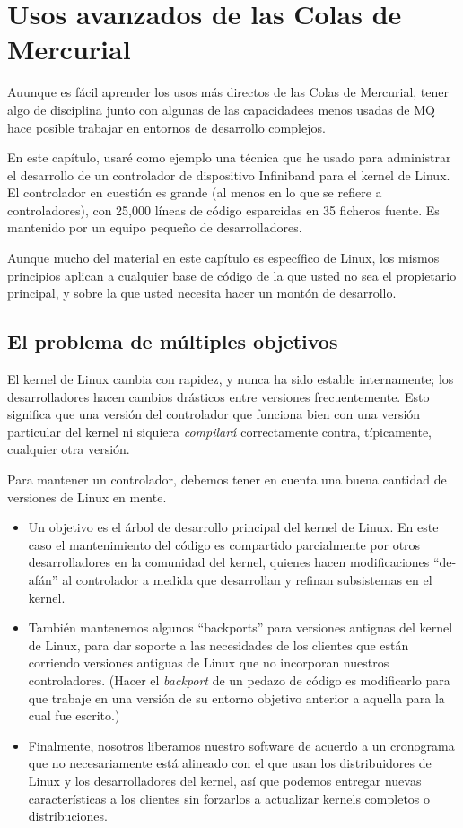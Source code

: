 \chapter{Usos avanzados de las Colas de Mercurial}
\label{chap:mq-collab}

Auunque es fácil aprender los usos más directos de las Colas de
Mercurial, tener algo de disciplina junto con algunas de las
capacidadees menos usadas de MQ hace posible trabajar en entornos de
desarrollo complejos.

En este capítulo, usaré como ejemplo una técnica que he usado para
administrar el desarrollo de un controlador de dispositivo Infiniband
para el kernel de Linux. El controlador en cuestión es grande
(al menos en lo que se refiere a controladores), con 25,000 líneas de
código esparcidas en 35 ficheros fuente. Es mantenido por un equipo
pequeño de desarrolladores. 

Aunque mucho del material en este capítulo es específico de Linux, los
mismos principios aplican a cualquier base de código de la que usted
no sea el propietario principal, y sobre la que usted necesita hacer
un montón de desarrollo.

\section{El problema de múltiples objetivos}

El kernel de Linux cambia con rapidez, y nunca ha sido estable
internamente; los desarrolladores hacen cambios drásticos entre
versiones frecuentemente. Esto significa que una versión del
controlador que funciona bien con una versión particular del kernel ni
siquiera \emph{compilará} correctamente contra, típicamente, cualquier
otra versión.

Para mantener un controlador, debemos tener en cuenta una buena
cantidad de versiones de Linux en mente.
\begin{itemize}
\item Un objetivo es el árbol de desarrollo principal del kernel de
  Linux. En este caso el mantenimiento del código es compartido
  parcialmente por otros desarrolladores en la comunidad del kernel, 
  quienes hacen modificaciones ``de-afán'' al controlador a medida que 
  desarrollan y refinan subsistemas en el kernel.
\item También mantenemos algunos ``backports'' para versiones antiguas
  del kernel de Linux, para dar soporte a las necesidades de los
  clientes que están corriendo versiones antiguas de Linux que no
  incorporan nuestros controladores. (Hacer el \emph{backport} de un
  pedazo de código es modificarlo para que trabaje en una versión
  de su entorno objetivo anterior a aquella para la cual fue escrito.)
\item Finalmente, nosotros liberamos nuestro software de acuerdo a un
  cronograma que no necesariamente está alineado con el que usan los
  distribuidores de Linux y los desarrolladores del kernel, así que
  podemos entregar nuevas características a los clientes sin forzarlos
  a actualizar kernels completos o distribuciones.
\end{itemize}

